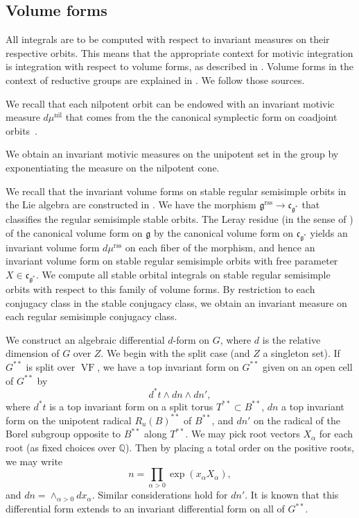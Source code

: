 \documentclass[12pt]{amsart}
\newcommand{\op}[1]{\operatorname{#1}}
\newcommand{\ring}[1]{{\mathbb #1}}
\newcommand{\fg}{\mathfrak{g}}
\newcommand{\fc}{\mathfrak{c}}
\newcommand{\reg}{\mathrm{rss}}
\theoremstyle{plain}
\theoremstyle{definition}
\begin{document}
\subsection{Volume forms}\label{sec:volume}

All integrals are to be computed with respect to invariant measures on
their respective orbits.  This means that the appropriate context for
motivic integration is integration with respect to volume forms, as
described in \cite[Sec. 8]{CL}.    Volume forms in the context of
reductive groups are explained in \cite{CGH}.  We follow
those sources.

We recall that each nilpotent orbit can be endowed with an invariant
motivic measure $d\mu^{\op{nil}}$ that comes from the the canonical
symplectic form on coadjoint orbits~\cite[Prop.~4.3]{CGH}.  

We obtain an invariant motivic measures on the unipotent set in the
group by exponentiating the measure on the nilpotent cone.

We recall that the invariant volume forms on stable regular semisimple
orbits in the Lie algebra are constructed in \cite{CHL}.  We have the
morphism $\fg^\reg\to\fc_{\fg^*}$ that classifies the regular
semisimple stable orbits.  The Leray residue (in the sense of
\cite{CL}) of the canonical volume form on $\fg$ by the canonical
volume form on $\fc_{\fg^*}$ yields an invariant volume form
$d\mu^\reg$ on each fiber of the morphism, and hence an invariant
volume form on stable regular semisimple orbits with free parameter
$X\in\fc_{\fg^*}$.  We compute all stable orbital integrals on stable
regular semisimple orbits with respect to this family of volume forms.
By restriction to each conjugacy class in the stable conjugacy class,
we obtain an invariant measure on each regular semisimple conjugacy
class.



We construct an algebraic differential $d$-form on $G$, where $d$ is
the relative dimension of $G$ over $Z$.  We begin with the split case
(and $Z$ a singleton set).  If $G^{**}$ is split over $\op{VF}$, we
have a top invariant form on $G^{**}$ given on an open cell of
$G^{**}$ by
\begin{equation}\label{eqn:omegaK}
d^*t\land dn\land dn',
\end{equation}
where $d^*t$ is a top invariant form on a split torus $T^{**} \subset
B^{**}$, $dn$ a top invariant form on the unipotent radical
$R_u(B)^{**}$ of $B^{**}$, and $dn'$ on the radical of the Borel
subgroup opposite to $B^{**}$ along $T^{**}$.  We may pick root
vectors $X_\alpha$ for each root (as fixed choices over $\ring{Q}$).
Then by placing a total order on the positive roots, we may write
\[
n = \prod_{\alpha>0}\exp(x_\alpha X_\alpha),
\]
and $dn = \land_{\alpha>0} dx_\alpha$.  Similar considerations hold
for $dn'$.  It is known that this differential form extends to an
invariant differential form on all of $G^{**}$.
\end{document}
